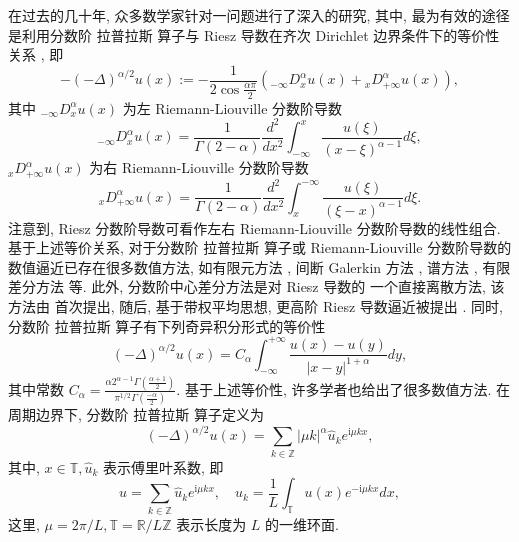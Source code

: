 在过去的几十年, 众多数学家针对一问题进行了深入的研究, 其中, 最为有效的途径是利用分数阶 拉普拉斯 算子与 Riesz 导数在齐次 Dirichlet 边界条件下的等价性关系 \cite{yangNumericalMethodsFractional2010,demengelFunctionalSpacesTheory2012}, 即
\begin{equation}
-(-\Delta)^{\alpha / 2} u(x):=-\frac{1}{2 \cos \frac{\alpha \pi}{2}}\left({ }_{-\infty }D_x^\alpha u(x)+{ }_x D_{+\infty}^\alpha u(x)\right),
\end{equation}
其中 ${ }_{-\infty} D_x^\alpha u(x)$ 为左 Riemann-Liouville 分数阶导数
\begin{equation}
{ }_{-\infty} D_x^\alpha u(x)=\frac{1}{\Gamma(2-\alpha)} \frac{d^2}{d x^2} \int_{-\infty}^x \frac{u(\xi)}{(x-\xi)^{\alpha-1}} d \xi,
\end{equation}
${ }_x D_{+\infty}^\alpha u(x)$ 为右 Riemann-Liouville 分数阶导数
\begin{equation}
{ }_x D_{+\infty}^\alpha u(x)=\frac{1}{\Gamma(2-\alpha)} \frac{d^2}{d x^2} \int^{-\infty}_x \frac{u(\xi)}{(\xi-x)^{\alpha-1}} d \xi .
\end{equation}
注意到, Riesz 分数阶导数可看作左右 Riemann-Liouville 分数阶导数的线性组合.
基于上述等价关系, 对于分数阶 拉普拉斯 算子或 Riemann-Liouville 分数阶导数的数值逼近已存在很多数值方法, 如有限元方法 \cite{dengFiniteElementMethod2009,ervinNumericalApproximationTime2007}, 间断 Galerkin 方法 \cite{xuDiscontinuousGalerkinMethod2014}, 谱方法 \cite{zayernouriFractionalSpectralCollocation2014,zengCrankNicolsonADI2014}, 有限差分方法 \cite{chenFourthOrderAccurate2014,meerschaertFiniteDifferenceApproximations2004} 等. 
此外, 分数阶中心差分方法是对 Riesz 导数的 一个直接离散方法, 该方法由 \cite{duAnalysisApproximationNonlocal2012} 首次提出, 随后, 基于带权平均思想, 更高阶 Riesz 导数逼近被提出 \cite{dingHighorderAlgorithmsRiesz2015,zhangFourthOrderCompactDifference2014}.
同时, 分数阶 拉普拉斯 算子有下列奇异积分形式的等价性 \cite{duAnalysisApproximationNonlocal2012}
\begin{equation}
(-\Delta)^{\alpha / 2} u(x)=C_\alpha \int_{-\infty}^{+\infty} \frac{u(x)-u(y)}{|x-y|^{1+\alpha}} d y,
\end{equation}
其中常数 $C_\alpha=\frac{\alpha 2^{\alpha-1} \Gamma\left(\frac{\alpha+1}{2}\right)}{\pi^{1 / 2} \Gamma\left(\frac{-\alpha}{2}\right)}$. 基于上述等价性, 许多学者也给出了很多数值方法\cite{gaoMeanExitTime2014,huangNumericalMethodsFractional2014}. 在周期边界下, 分数阶 拉普拉斯 算子定义为 \cite{guoFractionalPartialDifferential2015}
\begin{equation}
(-\Delta)^{\alpha / 2} u(x)=\sum_{k \in \mathbb{Z}}|\mu k|^\alpha \hat{u}_k e^{\mathrm{i} \mu k x},
\end{equation}
其中, $x \in \mathbb{T}, \hat{u}_k$ 表示傅里叶系数, 即
\begin{equation}
u=\sum_{k \in \mathbb{Z}} \hat{u}_k e^{\mathrm{i} \mu k x}, \quad \hat{u}_k=\frac{1}{L} \int_{\mathbb{T}} u(x) e^{-\mathrm{i} \mu k x} d x,
\end{equation}
这里, $\mu=2 \pi / L, \mathbb{T}=\mathbb{R} / L \mathbb{Z}$ 表示长度为 $L$ 的一维环面.


